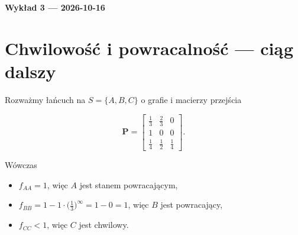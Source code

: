 \documentclass[dvipsnames]{book}
\begin{document}
\begin{center}
  {\Large\bfseries Wykład 3 --- 2026-10-16}
\end{center}

\section*{Chwilowość i powracalność --- ciąg dalszy}

\begin{przyklad}
Rozważmy łańcuch na $S = \{A, B, C\}$ o grafie i macierzy przejścia
\begin{center}
\begin{minipage}{0.45\textwidth}
\centering
{}
\end{minipage}%
\begin{minipage}{0.45\textwidth}
\[
  \mathbf{P} =
  \begin{bmatrix}
    \frac13 & \frac23 & 0 \\
    1 & 0 & 0 \\
    \frac14 & \frac12 & \frac14
  \end{bmatrix}.
\]
\end{minipage}
\end{center}
Wówczas
\begin{itemize}[topsep=0pt,itemsep=0pt]
  \item $f_{AA} = 1$, więc $A$ jest stanem powracającym,
  \item $f_{BB} = 1 - 1 \cdot \big(\tfrac13\big)^{\infty} = 1 - 0 = 1$, więc
  $B$ jest powracający,
  \item $f_{CC} < 1$, więc $C$ jest chwilowy.
\end{itemize}
\end{przyklad}
\end{document}
